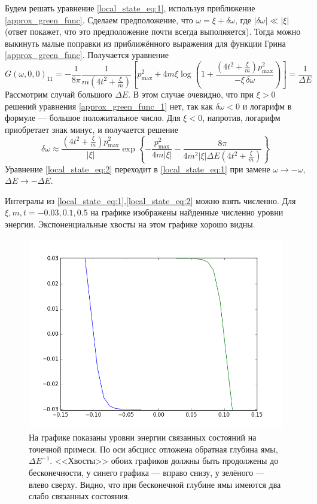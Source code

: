 Будем решать уравнение \eqref{local_state_eq:1}, 
используя приближение \eqref{approx_green_func}. 
Сделаем предположение, что $\omega = \xi + \delta \omega$, где $|\delta \omega| \ll |\xi|$
(ответ покажет, что это предположение почти всегда выполняется). Тогда можно выкинуть малые 
поправки из приближённого выражения для функции Грина \eqref{approx_green_func}. Получается
уравнение
\begin{equation}
    \label{approx_green_func_1}
    G(\omega,0,0)_{11} = -\frac{1}{8\pi}\frac{1}{m(4t^2 + \frac{\xi}{m})}
        \left[ p_{\mathrm{max}}^2 + 
             4m\xi\log{\left(1 + \frac{\left(4t^2 + \frac{\xi}{m}\right)p_{\mathrm{max}}^2}
                                    {-\xi\,\delta \omega}\right)}\right] = \frac{1}{\Delta E}
\end{equation}
Рассмотрим случай большого $\Delta E$. В этом случае очевидно, что при $\xi > 0$ решений
уравнения \eqref{approx_green_func_1} нет, так как $\delta \omega < 0$ и логарифм в формуле ---
большое положитальное число. Для $\xi < 0$, напротив, логарифм приобретает знак минус, 
и получается решение 
\begin{equation} 
    \delta \omega \approx \frac{\left(4t^2 + \frac{\xi}{m}\right)p_{\mathrm{max}}^2}{|\xi|}
            \exp\left\{ -\frac{p_{\mathrm{max}}^2}{4m|\xi|} - 
                        \frac{8\pi}{4m^2|\xi|\Delta E\left(4t^2 + \frac{\xi}{m}\right)}\right\}
\end{equation}
Уравнение \eqref{local_state_eq:2} переходит в \eqref{local_state_eq:1}  при замене 
$\omega \to -\omega$, $\Delta E \to -\Delta E$.

Интегралы из \eqref{local_state_eq:1},\eqref{local_state_eq:2} 
можно взять численно. Для 
$\xi, m, t = -0.03, 0.1, 0.5$ на графике изображены найденные численно уровни энергии.
Экспоненциальные хвосты на этом графике хорошо видны.

\begin{figure}[h]
    \centering
    \includegraphics[width=0.8\linewidth]{impurity_levels.png}
    \caption{
            На графике показаны уровни энергии связанных состояний на точечной примеси. 
            По оси абсцисс отложена обратная глубина ямы, $\Delta E^{-1}$. <<Хвосты>>
            обоих графиков должны быть продолжены до бесконечности, у синего графика ---
            вправо снизу, у зелёного --- влево сверху. Видно,
            что при бесконечной глубине ямы имеются два слабо связанных состояния.
            }
\end{figure}

